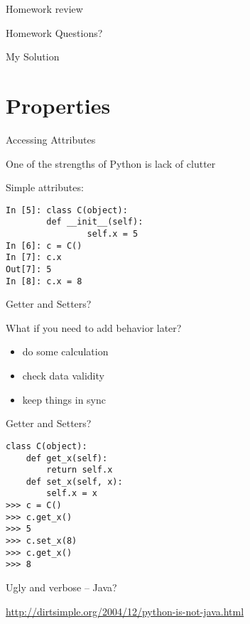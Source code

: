 \documentclass{beamer}
\begin{document}
\begin{frame}{Homework review}

  \vfill
  {\Large Homework Questions? }

  \vfill
  {\Large My Solution}

  \vfill

\end{frame}

\section{Properties}

\begin{frame}[fragile]{Accessing Attributes}

{\Large One of the strengths of Python is lack of clutter}

\vfill
{\Large Simple attributes:}

\begin{verbatim}
In [5]: class C(object):
        def __init__(self):
                self.x = 5
In [6]: c = C()
In [7]: c.x
Out[7]: 5
In [8]: c.x = 8
\end{verbatim}

\end{frame} 

\begin{frame}[fragile]{Getter and Setters?}

{\Large What if you need to add behavior later?}

\begin{itemize}
  \item do some calculation
  \item check data validity
  \item keep things in sync
\end{itemize}

\end{frame}


\begin{frame}[fragile]{Getter and Setters?}

\begin{verbatim}
class C(object):
    def get_x(self):
        return self.x
    def set_x(self, x):
        self.x = x
>>> c = C()
>>> c.get_x()
>>> 5
>>> c.set_x(8)
>>> c.get_x()
>>> 8
\end{verbatim}
{\Large Ugly and verbose -- Java?}

\url{http://dirtsimple.org/2004/12/python-is-not-java.html}

\end{frame} 
\end{document}
